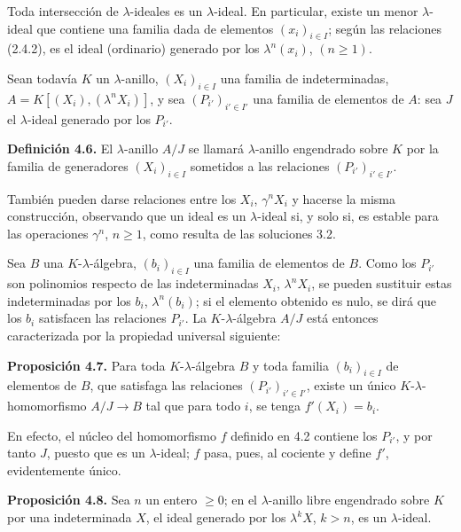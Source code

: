 Toda intersección de \(\lambda\)-ideales es un \(\lambda\)-ideal. En particular, existe un menor \(\lambda\)-ideal que contiene una familia dada de elementos \((x_i)_{i\in I}\); según las relaciones (2.4.2), es el ideal (ordinario) generado por los \(\lambda^n(x_i)\), \((n\ge1)\).

Sean todavía \(K\) un \(\lambda\)-anillo, \((X_i)_{i\in I}\) una familia de indeterminadas, \(A=K[(X_i),(\lambda^n X_i)]\), y sea \((P_{i'})_{i'\in I'}\) una familia de elementos de \(A\): sea \(J\) el \(\lambda\)-ideal generado por los \(P_{i'}\).

\textbf{Definición 4.6.} El \(\lambda\)-anillo \(A/J\) se llamará \(\lambda\)-anillo engendrado sobre \(K\) por la familia de generadores \((X_i)_{i\in I}\) sometidos a las relaciones \((P_{i'})_{i'\in I'}\).

También pueden darse relaciones entre los \(X_i\), \(\gamma^n X_i\) y hacerse la misma construcción, observando que un ideal es un \(\lambda\)-ideal si, y solo si, es estable para las operaciones \(\gamma^n\), \(n\ge1\), como resulta de las soluciones 3.2.

Sea \(B\) una \(K\)-\(\lambda\)-álgebra, \((b_i)_{i\in I}\) una familia de elementos de \(B\). Como los \(P_{i'}\) son polinomios respecto de las indeterminadas \(X_i\), \(\lambda^n X_i\), se pueden sustituir estas indeterminadas por los \(b_i\), \(\lambda^n(b_i)\); si el elemento obtenido es nulo, se dirá que los \(b_i\) satisfacen las relaciones \(P_{i'}\). La \(K\)-\(\lambda\)-álgebra \(A/J\) está entonces caracterizada por la propiedad universal siguiente:

\textbf{Proposición 4.7.} Para toda \(K\)-\(\lambda\)-álgebra \(B\) y toda familia \((b_i)_{i\in I}\) de elementos de \(B\), que satisfaga las relaciones \((P_{i'})_{i'\in I'}\), existe un único \(K\)-\(\lambda\)-homomorfismo \(A/J\to B\) tal que para todo \(i\), se tenga \(f'(X_i)=b_i\).

En efecto, el núcleo del homomorfismo \(f\) definido en 4.2 contiene los \(P_{i'}\), y por tanto \(J\), puesto que es un \(\lambda\)-ideal; \(f\) pasa, pues, al cociente y define \(f'\), evidentemente único.

\textbf{Proposición 4.8.} Sea \(n\) un entero \(\ge0\); en el \(\lambda\)-anillo libre engendrado sobre \(K\) por una indeterminada \(X\), el ideal generado por los \(\lambda^k X\), \(k>n\), es un \(\lambda\)-ideal.


